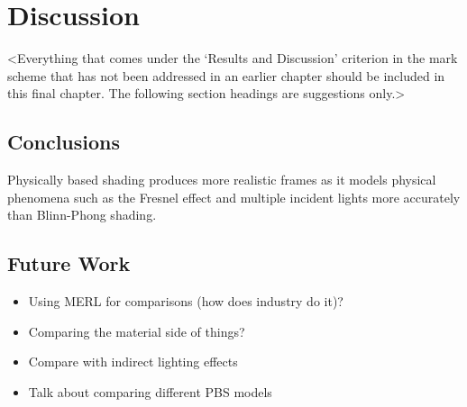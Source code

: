 \chapter{Discussion}
\label{chapter4}

<Everything that comes under the `Results and Discussion' criterion in the mark scheme that has not been addressed in an earlier chapter should be included in this final chapter. The following section headings are suggestions only.>

\section{Conclusions}

Physically based shading produces more realistic frames as it models physical phenomena such as the Fresnel effect and multiple incident lights more accurately than Blinn-Phong shading.

\section{Future Work}

\begin{itemize}
	\item Using MERL for comparisons (how does industry do it)?
	\item Comparing the material side of things?
	\item Compare with indirect lighting effects
	\item Talk about comparing different PBS models
\end{itemize}


